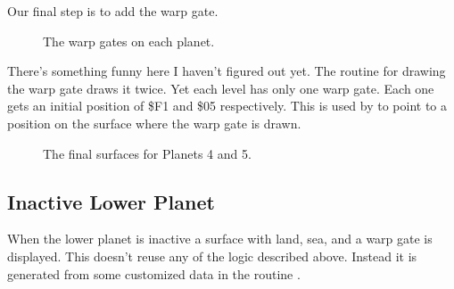 Our final step is to add the warp gate.
\begin{figure}[H]
  {
    \setlength{\tabcolsep}{3.0pt}
    \setlength\cmidrulewidth{\heavyrulewidth} %
    \begin{adjustbox}{width=15cm,center}
      \begin{subfigure}{0.3\textwidth}
        
      \end{subfigure}
      \begin{subfigure}{0.3\textwidth}
        
      \end{subfigure}
      \begin{subfigure}{0.3\textwidth}
        
      \end{subfigure}
      \begin{subfigure}{0.3\textwidth}
        
      \end{subfigure}
      \begin{subfigure}{0.3\textwidth}
        
      \end{subfigure}
    \end{adjustbox}
  }\caption[]{The warp gates on each planet.}
\end{figure}

There's something funny here I haven't figured out yet. The routine for drawing the warp gate
draws it twice. Yet each level has only one warp gate. Each one gets an initial position of
\$F1 and \$05 respectively. This is used by  to 
point to a position on the surface where the warp gate is drawn.

%


\begin{figure}[H]
  {
      \begin{subfigure}{0.7\textwidth}
      \end{subfigure}
      \begin{subfigure}{0.7\textwidth}
      \end{subfigure}
  }\caption[]{The final surfaces for Planets 4 and 5.}
\end{figure}

\subsection{Inactive Lower Planet}
When the lower planet is inactive a surface with land, sea, and a warp gate is displayed. This doesn't reuse
any of the logic described above. Instead it is generated from some customized data in the routine
.

%


